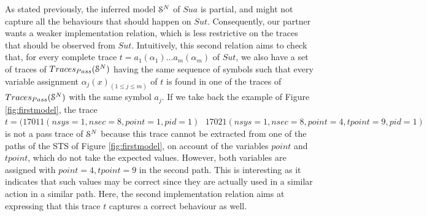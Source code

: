 As stated previously, the inferred model $\EuScript{S}^{N}$ of
$\mathit{Sua}$ is partial, and might not capture all the
behaviours that should happen on $\mathit{Sut}$. Consequently,
our partner wants a weaker implementation relation, which is less
restrictive on the traces that should be observed from
$\mathit{Sut}$.  Intuitively, this second relation aims to check
that, for every complete trace $t=a_1(\alpha_1)...a_m(\alpha_m)$
of $\mathit{Sut}$, we also have a set of traces of
$Traces_{Pass}(\EuScript{S}^{N})$ having the same sequence of
symbols such that every variable assignment $\alpha_j(x)_{(1 \leq
j \leq m)}$ of $t$ is found in one of the traces of
$Traces_{Pass}(\EuScript{S}^{N})$ with the same symbol $a_j$.
If we take back the example of Figure \ref{fig:firstmodel}, the
trace $t=(17011(nsys=1,nsec=8,point=1,pid=1)\text{ }
17021(nsys=1,nsec=8,point=4,tpoint=9,pid=1)$ is not a pass trace
of $\EuScript{S}^{N}$ because this trace cannot be extracted from
one of the paths of the STS of Figure \ref{fig:firstmodel}, on
account of the variables $point$ and $tpoint$, which do not take
the expected values. However, both variables are assigned with
$point=4,tpoint=9$ in the second path. This is interesting as it
indicates that such values may be correct since they are actually
used in a similar action in a similar path. Here, the second
implementation relation aims at expressing that this trace $t$
captures a correct behaviour as well.

